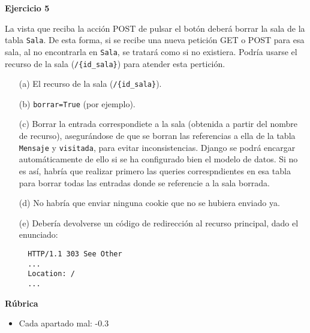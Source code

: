 \textbf{Ejercicio 5}

La vista que reciba la acción POST de pulsar el botón deberá borrar la sala de la tabla \texttt{Sala}. De esta forma, si se recibe una nueva petición GET o POST para esa sala, al no encontrarla en \texttt{Sala}, se tratará como si no existiera. Podría usarse el recurso de la sala (\texttt{/\{id\_sala\}}) para atender esta pertición.

\begin{itemize}

\item[(a)] El recurso de la sala (\texttt{/\{id\_sala\}}).
 
\item[(b)] \texttt{borrar=True} (por ejemplo).

\item[(c)] Borrar la entrada correspondiete a la sala (obtenida a partir del nombre de recurso), asegurándose de que se borran las referencias a ella de la tabla \texttt{Mensaje} y \texttt{visitada}, para evitar inconsistencias. Django se podrá encargar automáticamente de ello si se ha configurado bien el modelo de datos. Si no es así, habría que realizar primero las queries correspndientes en esa tabla para borrar todas las entradas donde se referencie a la sala borrada.

\item[(d)] No habría que enviar ninguna cookie que no se hubiera enviado ya.

\item[(e)] Debería devolverse un código de redirección al recurso principal, dado el enunciado:

\begin{verbatim}
  HTTP/1.1 303 See Other
  ...
  Location: /
  ...
\end{verbatim}


\end{itemize}

\vspace{.4cm}\textbf{Rúbrica}

\begin{itemize}
\item Cada apartado mal: -0.3
\end{itemize}


